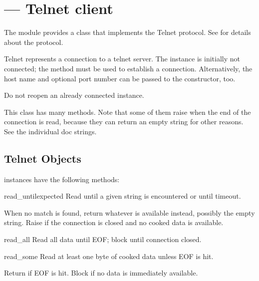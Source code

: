 
\section{ ---
         Telnet client}



The  module provides a  class that
implements the Telnet protocol.  See  for details about the
protocol.


\begin{classdesc}{Telnet}{}
 represents a connection to a telnet server. The
instance is initially not connected; the  method must
be used to establish a connection.  Alternatively, the host name and
optional port number can be passed to the constructor, too.

Do not reopen an already connected instance.

This class has many  methods.  Note that some of them 
raise  when the end of the connection is read,
because they can return an empty string for other reasons.  See the
individual doc strings.
\end{classdesc}


\subsection{Telnet Objects \label{telnet-objects}}

 instances have the following methods:


\begin{methoddesc}[Telnet]{read_until}{expected}
Read until a given string is encountered or until timeout.

When no match is found, return whatever is available instead,
possibly the empty string.  Raise  if the connection
is closed and no cooked data is available.
\end{methoddesc}

\begin{methoddesc}[Telnet]{read_all}{}
Read all data until EOF; block until connection closed.
\end{methoddesc}

\begin{methoddesc}[Telnet]{read_some}{}
Read at least one byte of cooked data unless EOF is hit.

Return  if EOF is hit.  Block if no data is immediately available.
\end{methoddesc}

